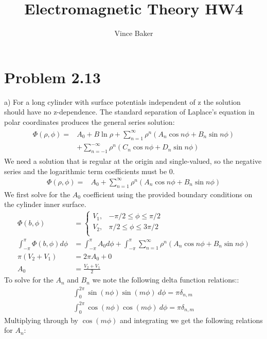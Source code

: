 \documentclass[a4paper,11pt]{article}
\title{Electromagnetic Theory HW4}
\author{Vince Baker}
\numberwithin{equation}{section}
\newcommand{\lrp}[1]{\left({#1}\right)}
\begin{document}
\maketitle

\section{Problem 2.13}
a) For a long cylinder with surface potentials independent of z the solution should have no z-dependence.
The standard separation of Laplace's equation in polar coordinates produces the general series solution:
\begin{align}
 \begin{split}
  \Phi(\rho, \phi) = &A_0 + B\ln{\rho}+\sum_{n=1}^\infty \rho^n\lrp{A_n\cos{n\phi}+B_n\sin{n\phi}}\\
		    &+ \sum_{n=-1}^{-\infty} \rho^n\lrp{C_n\cos{n\phi}+D_n\sin{n\phi}}
 \end{split}
\end{align}
We need a solution that is regular at the origin and single-valued, so the negative series and the logarithmic term coefficients must be 0.
\begin{align}
  \Phi(\rho, \phi) = &A_0 +\sum_{n=1}^\infty \rho^n\lrp{A_n\cos{n\phi}+B_n\sin{n\phi}}
\end{align}
We first solve for the $A_0$ coefficient using the provided boundary conditions on the cylinder inner surface.
\begin{align}
 \Phi(b,\phi) &= \begin{cases}
                 V_1,& -\pi/2\le\phi\le\pi/2 \\
                 V_2,& \pi/2\le\phi\le3\pi/2 \\
                \end{cases}\\
 \int_{-\pi}^\pi \Phi(b,\phi) d\phi &= \int_{-\pi}^\pi A_0 d\phi + \int_{-\pi}^{\pi}\sum_{n=1}^\infty \rho^n\lrp{A_n\cos{n\phi}+B_n\sin{n\phi}}\\
 \pi (V_2+V_1) &= 2\pi A_0 + 0\\
 A_0 &= \frac{V_2+V_1}{2}
\end{align}
To solve for the $A_n$ and $B_n$ we note the following delta function relations::
\begin{align}
 \int_0^{2\pi}\sin{(n\phi)}\sin{(m\phi)}\ d\phi = \pi\delta_{n,m}\\
 \int_0^{2\pi}\cos{(n\phi)}\cos{(m\phi)}\ d\phi = \pi\delta_{n,m}
\end{align}
Multiplying through by $\cos{(m\phi)}$ and integrating we get the following relations for $A_n$:
\end{document}
